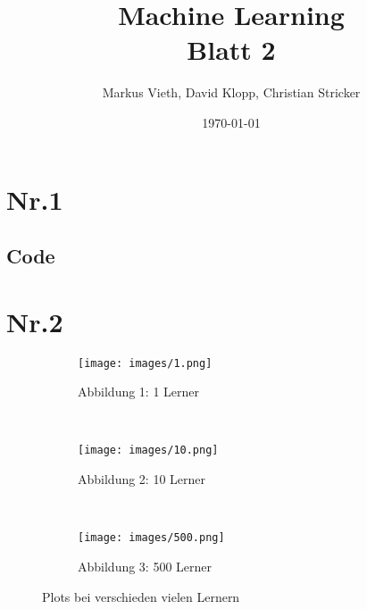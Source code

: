 \documentclass[a4paper,11pt,twoside]{article}
\title{Machine Learning\\ Blatt 2}
\author{Markus Vieth, David Klopp, Christian Stricker}
\date{\today}
\begin{document}
\newcommand{\cor}[1]{\textcolor{red}{\textit{#1}}}
\maketitle
\cleardoublepage
\pagestyle{myheadings}

\section*{Nr.1}
\subsection*{Code}


\newpage

\section*{Nr.2}
\begin{figure*}[t!]
	\centering
	\begin{subfigure}[t]{0.33\textwidth}
		\texttt{[image: images/1.png]}
		\caption{Abbildung 1: 1 Lerner}
	\end{subfigure}%
	~
	\begin{subfigure}[t]{0.33\textwidth}
		\texttt{[image: images/10.png]}
		\caption{Abbildung 2: 10 Lerner}
	\end{subfigure}%
	~
	\begin{subfigure}[t]{0.33\textwidth}
		\texttt{[image: images/500.png]}
		\caption{Abbildung 3: 500 Lerner}
	\end{subfigure}
	
	\caption*{Plots bei verschieden vielen Lernern}
\end{figure*}
\end{document}
